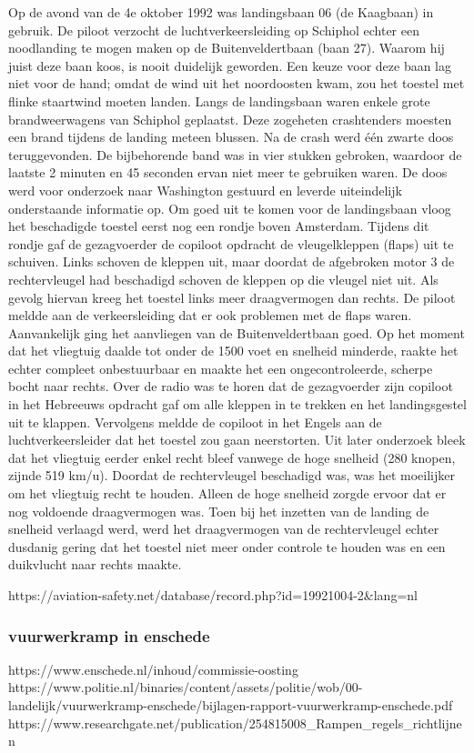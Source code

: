 Op de avond van de 4e oktober 1992 was landingsbaan 06 (de Kaagbaan) in gebruik. De piloot verzocht de luchtverkeersleiding op Schiphol echter een noodlanding te mogen maken op de Buitenveldertbaan (baan 27). Waarom hij juist deze baan koos, is nooit duidelijk geworden. Een keuze voor deze baan lag niet voor de hand; omdat de wind uit het noordoosten kwam, zou het toestel met flinke staartwind moeten landen. Langs de landingsbaan waren enkele grote brandweerwagens van Schiphol geplaatst. Deze zogeheten crashtenders moesten een brand tijdens de landing meteen blussen. Na de crash werd één zwarte doos teruggevonden. De bijbehorende band was in vier stukken gebroken, waardoor de laatste 2 minuten en 45 seconden ervan niet meer te gebruiken waren. De doos werd voor onderzoek naar Washington gestuurd en leverde uiteindelijk onderstaande informatie op.
Om goed uit te komen voor de landingsbaan vloog het beschadigde toestel eerst nog een rondje boven Amsterdam. Tijdens dit rondje gaf de gezagvoerder de copiloot opdracht de vleugelkleppen (flaps) uit te schuiven. Links schoven de kleppen uit, maar doordat de afgebroken motor 3 de rechtervleugel had beschadigd schoven de kleppen op die vleugel niet uit. Als gevolg hiervan kreeg het toestel links meer draagvermogen dan rechts. De piloot meldde aan de verkeersleiding dat er ook problemen met de flaps waren.
Aanvankelijk ging het aanvliegen van de Buitenveldertbaan goed. Op het moment dat het vliegtuig daalde tot onder de 1500 voet en snelheid minderde, raakte het echter compleet onbestuurbaar en maakte het een ongecontroleerde, scherpe bocht naar rechts. Over de radio was te horen dat de gezagvoerder zijn copiloot in het Hebreeuws opdracht gaf om alle kleppen in te trekken en het landingsgestel uit te klappen. Vervolgens meldde de copiloot in het Engels aan de luchtverkeersleider dat het toestel zou gaan neerstorten. Uit later onderzoek bleek dat het vliegtuig eerder enkel recht bleef vanwege de hoge snelheid (280 knopen, zijnde 519 km/u). Doordat de rechtervleugel beschadigd was, was het moeilijker om het vliegtuig recht te houden. Alleen de hoge snelheid zorgde ervoor dat er nog voldoende draagvermogen was. Toen bij het inzetten van de landing de snelheid verlaagd werd, werd het draagvermogen van de rechtervleugel echter dusdanig gering dat het toestel niet meer onder controle te houden was en een duikvlucht naar rechts maakte.

https://aviation-safety.net/database/record.php?id=19921004-2&lang=nl 
\subsubsection{vuurwerkramp in enschede }
https://www.enschede.nl/inhoud/commissie-oosting 
https://www.politie.nl/binaries/content/assets/politie/wob/00-landelijk/vuurwerkramp-enschede/bijlagen-rapport-vuurwerkramp-enschede.pdf 
https://www.researchgate.net/publication/254815008_Rampen_regels_richtlijnen 
\cite{boogers092002RampenRegelsRichtlijnen}

